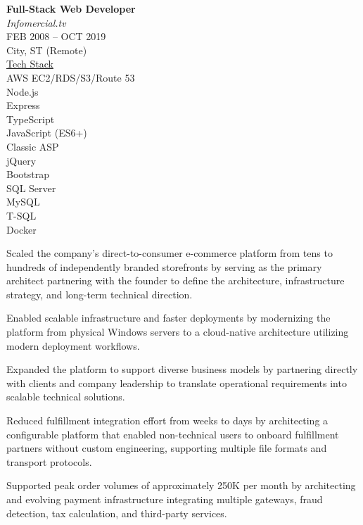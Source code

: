 \documentclass[10pt]{article}
\newcommand{\jobmeta}[5]{%
  \textbf{#1}\\
  \textit{#2}\\[4pt]
  {\color{lighttext}#3}\\
  {\color{lighttext}#4}\\[4pt]
  {\underline{\color{lighttext}Tech Stack}}\\
  {\color{lighttext}#5}%
}
\begin{document}
\begin{entryrow}
  {\jobmeta
    {Full-Stack Web Developer}
    {Infomercial.tv}
    {FEB 2008 -- OCT 2019}
    {City, ST (Remote)}
    {
      AWS EC2/RDS/S3/Route 53\\
      Node.js\\
      Express\\
      TypeScript\\
      JavaScript (ES6+)\\
      Classic ASP\\
      jQuery\\
      Bootstrap\\
      SQL Server\\
      MySQL\\
      T-SQL\\
      Docker\\
    }
  }
  \begin{resumeitems}
    \item Scaled the company's direct-to-consumer e-commerce platform from tens to hundreds of independently branded storefronts by serving as the primary architect partnering with the founder to define the architecture, infrastructure strategy, and long-term technical direction.
    \item Enabled scalable infrastructure and faster deployments by modernizing the platform from physical Windows servers to a cloud-native architecture utilizing modern deployment workflows.
    \item Expanded the platform to support diverse business models by partnering directly with clients and company leadership to translate operational requirements into scalable technical solutions.
    \item Reduced fulfillment integration effort from weeks to days by architecting a configurable platform that enabled non-technical users to onboard fulfillment partners without custom engineering, supporting multiple file formats and transport protocols.
    \item Supported peak order volumes of approximately 250K per month by architecting and evolving payment infrastructure integrating multiple gateways, fraud detection, tax calculation, and third-party services.

\end{resumeitems}
\end{entryrow}
\end{document}
